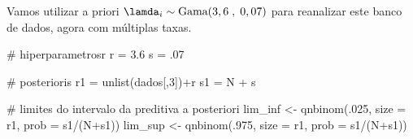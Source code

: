 \documentclass[
  letterpaper,
  DIV=11,
  numbers=noendperiod]{scrreprt}
\newenvironment{Shaded}{\begin{snugshade}}{\end{snugshade}}
\newcommand{\AttributeTok}[1]{\textcolor[rgb]{0.40,0.45,0.13}{#1}}
\newcommand{\CommentTok}[1]{\textcolor[rgb]{0.37,0.37,0.37}{#1}}
\newcommand{\DecValTok}[1]{\textcolor[rgb]{0.68,0.00,0.00}{#1}}
\newcommand{\FloatTok}[1]{\textcolor[rgb]{0.68,0.00,0.00}{#1}}
\newcommand{\FunctionTok}[1]{\textcolor[rgb]{0.28,0.35,0.67}{#1}}
\newcommand{\NormalTok}[1]{\textcolor[rgb]{0.00,0.23,0.31}{#1}}
\newcommand{\OtherTok}[1]{\textcolor[rgb]{0.00,0.23,0.31}{#1}}
\newcommand{\SpecialCharTok}[1]{\textcolor[rgb]{0.37,0.37,0.37}{#1}}
\theoremstyle{definition}
\theoremstyle{plain}
\theoremstyle{definition}
\theoremstyle{remark}
\begin{document}
Vamos utilizar a priori \(\lamda_i\sim\hbox{Gama}(3,6\;,\;0,07)\) para
reanalizar este banco de dados, agora com múltiplas taxas.

\begin{Shaded}
\begin{Highlighting}[]
\CommentTok{\# hiperparametrosr}
\NormalTok{r }\OtherTok{=} \FloatTok{3.6}
\NormalTok{s }\OtherTok{=}\NormalTok{ .}\DecValTok{07}

\CommentTok{\# posterioris}
\NormalTok{r1 }\OtherTok{=} \FunctionTok{unlist}\NormalTok{(dados[,}\DecValTok{3}\NormalTok{])}\SpecialCharTok{+}\NormalTok{r}
\NormalTok{s1 }\OtherTok{=}\NormalTok{ N }\SpecialCharTok{+}\NormalTok{ s}

\CommentTok{\# limites do intervalo da preditiva a posteriori}
\NormalTok{lim\_inf }\OtherTok{\textless{}{-}} \FunctionTok{qnbinom}\NormalTok{(.}\DecValTok{025}\NormalTok{, }\AttributeTok{size =}\NormalTok{ r1, }\AttributeTok{prob =}\NormalTok{ s1}\SpecialCharTok{/}\NormalTok{(N}\SpecialCharTok{+}\NormalTok{s1))}
\NormalTok{lim\_sup }\OtherTok{\textless{}{-}} \FunctionTok{qnbinom}\NormalTok{(.}\DecValTok{975}\NormalTok{, }\AttributeTok{size =}\NormalTok{ r1, }\AttributeTok{prob =}\NormalTok{ s1}\SpecialCharTok{/}\NormalTok{(N}\SpecialCharTok{+}\NormalTok{s1))}


\end{Highlighting}
\end{Shaded}
\end{document}
